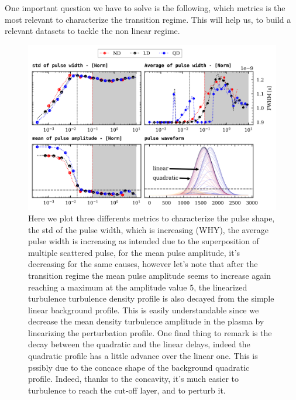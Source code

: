\documentclass[11pt,a4paper,openany]{report}
\begin{document}
\begin{multicols}{2}
    One important question we have to solve is the following, which metrics is the most relevant to characterize the transition regime. This will help us, to build a relevant datasets to tackle the non linear regime.

    \begin{figure}[H]
        \centering
        \includegraphics[width=1\linewidth]{./figures/pulse_params.png} %
        \caption{Here we plot three differents metrics to characterize the pulse shape, the std of the pulse width, which is increasing (WHY), the average pulse width is increasing as intended due to the superposition of multiple scattered pulse, for the mean pulse amplitude, it's decreasing for the same causes, however let's note that after the transition regime the mean pulse amplitude seems to increase again reaching a maximum at the amplitude value $5$, the linearized turbulence turbulence density profile is also decayed from the simple linear background profile. This is easily understandable since we decrease the mean density turbulence amplitude in the plasma by linearizing the perturbation profile.
            One final thing to remark is the decay between the quadratic and the linear delays, indeed the quadratic profile has a little advance over the linear one. This is pssibly due to the concace shape of the background quadratic profile. Indeed, thanks to the concavity, it's much easier to turbulence to reach the cut-off layer, and to perturb it.}
        \label{}
    \end{figure}


\end{multicols}
\end{document}
